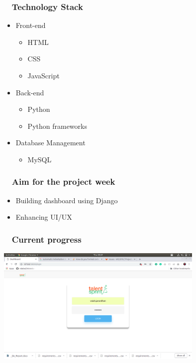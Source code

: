 \documentclass{beamer}
\begin{document}
\begin{frame}
\frametitle{ ~ Technology Stack} 
\begin {itemize}
\item Front-end
    \begin {itemize}
        \item{HTML} 
        \item{CSS}
        \item{JavaScript}
    \end{itemize}
\bigskip 
\item Back-end
    \begin {itemize}
        \item{Python} 
        \item{Python frameworks}
    \end{itemize}
\bigskip 
\item Database Management
    \begin {itemize}
        \item{MySQL}
    \end{itemize}
\end{itemize}
\end{frame}

\begin{frame}
\frametitle{ ~ Aim for the project week} 
\begin{itemize}
\item{Building dashboard using Django}
\item{Enhancing UI/UX}
\end{itemize}
\end{frame}



\begin{frame}
\frametitle{ ~ Current progress}
\begin{center}
\includegraphics[width = 10cm]{1.png}
\end{center}
\end{frame}
\end{document}
